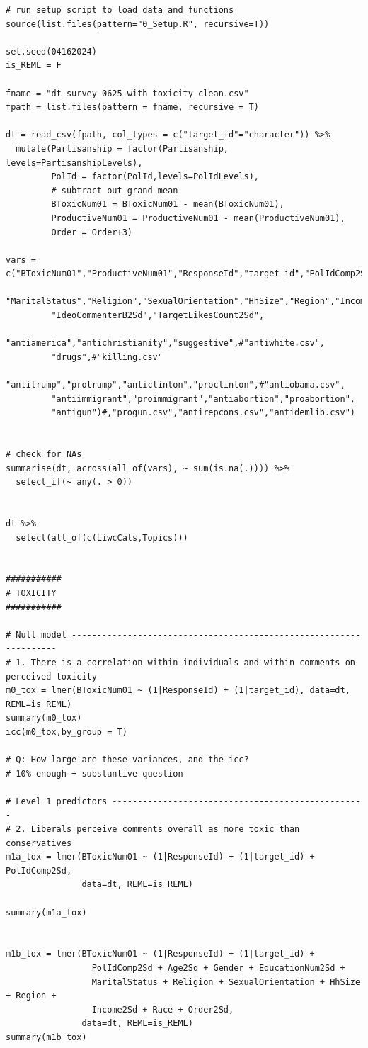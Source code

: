 \documentclass{article}
\begin{document}
\begin{lstlisting}
# run setup script to load data and functions
source(list.files(pattern="0_Setup.R", recursive=T))

set.seed(04162024)
is_REML = F

fname = "dt_survey_0625_with_toxicity_clean.csv"
fpath = list.files(pattern = fname, recursive = T)

dt = read_csv(fpath, col_types = c("target_id"="character")) %>% 
  mutate(Partisanship = factor(Partisanship, levels=PartisanshipLevels), 
         PolId = factor(PolId,levels=PolIdLevels), 
         # subtract out grand mean
         BToxicNum01 = BToxicNum01 - mean(BToxicNum01),
         ProductiveNum01 = ProductiveNum01 - mean(ProductiveNum01),
         Order = Order+3)

vars = c("BToxicNum01","ProductiveNum01","ResponseId","target_id","PolIdComp2Sd","Age2Sd","Gender","EducationNum2Sd",
         "MaritalStatus","Religion","SexualOrientation","HhSize","Region","Income2Sd","Race","Order",
         "IdeoCommenterB2Sd","TargetLikesCount2Sd",
         "antiamerica","antichristianity","suggestive",#"antiwhite.csv",
         "drugs",#"killing.csv"
         "antitrump","protrump","anticlinton","proclinton",#"antiobama.csv",
         "antiimmigrant","proimmigrant","antiabortion","proabortion",
         "antigun")#,"progun.csv","antirepcons.csv","antidemlib.csv")


# check for NAs
summarise(dt, across(all_of(vars), ~ sum(is.na(.)))) %>% 
  select_if(~ any(. > 0))


dt %>%
  select(all_of(c(LiwcCats,Topics))) 


###########
# TOXICITY
########### 

# Null model -------------------------------------------------------------------
# 1. There is a correlation within individuals and within comments on perceived toxicity
m0_tox = lmer(BToxicNum01 ~ (1|ResponseId) + (1|target_id), data=dt, REML=is_REML)
summary(m0_tox)
icc(m0_tox,by_group = T)

# Q: How large are these variances, and the icc?
# 10% enough + substantive question

# Level 1 predictors --------------------------------------------------
# 2. Liberals perceive comments overall as more toxic than conservatives
m1a_tox = lmer(BToxicNum01 ~ (1|ResponseId) + (1|target_id) + PolIdComp2Sd, 
               data=dt, REML=is_REML)

summary(m1a_tox)


m1b_tox = lmer(BToxicNum01 ~ (1|ResponseId) + (1|target_id) + 
                 PolIdComp2Sd + Age2Sd + Gender + EducationNum2Sd + 
                 MaritalStatus + Religion + SexualOrientation + HhSize + Region + 
                 Income2Sd + Race + Order2Sd, 
               data=dt, REML=is_REML)
summary(m1b_tox)



\end{lstlisting}
\end{document}
